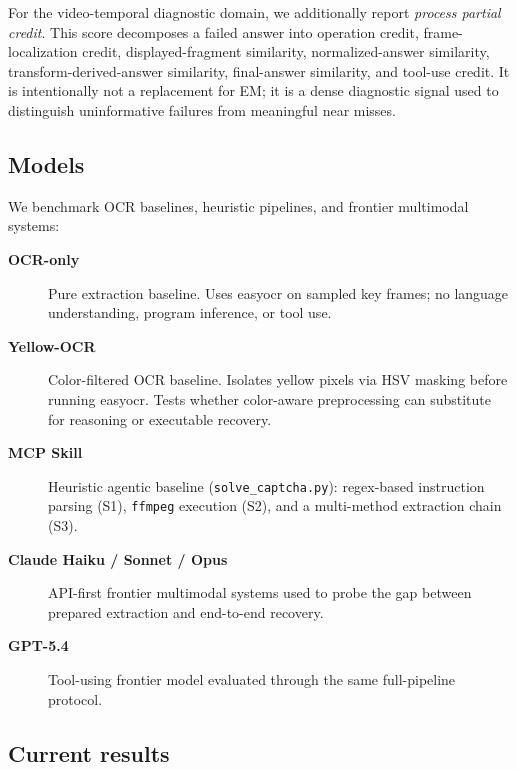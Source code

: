 For the video-temporal diagnostic domain, we additionally report \emph{process
partial credit}. This score decomposes a failed answer into operation credit,
frame-localization credit, displayed-fragment similarity, normalized-answer
similarity, transform-derived-answer similarity, final-answer similarity, and
tool-use credit. It is intentionally not a replacement for EM; it is a dense
diagnostic signal used to distinguish uninformative failures from meaningful
near misses.

\subsection{Models}

We benchmark OCR baselines, heuristic pipelines, and frontier multimodal
systems:

\begin{description}
  \item[\textbf{OCR-only}]
  Pure extraction baseline. Uses easyocr on sampled key frames; no language
  understanding, program inference, or tool use.

  \item[\textbf{Yellow-OCR}]
  Color-filtered OCR baseline. Isolates yellow pixels via HSV masking before
  running easyocr. Tests whether color-aware preprocessing can substitute for
  reasoning or executable recovery.

  \item[\textbf{MCP Skill}]
  Heuristic agentic baseline (\texttt{solve\_captcha.py}): regex-based
  instruction parsing (S1), \texttt{ffmpeg} execution (S2), and a multi-method
  extraction chain (S3).

  \item[\textbf{Claude Haiku / Sonnet / Opus}]
  API-first frontier multimodal systems used to probe the gap between prepared
  extraction and end-to-end recovery.

  \item[\textbf{GPT-5.4}]
  Tool-using frontier model evaluated through the same full-pipeline protocol.
\end{description}

\subsection{Current results}

